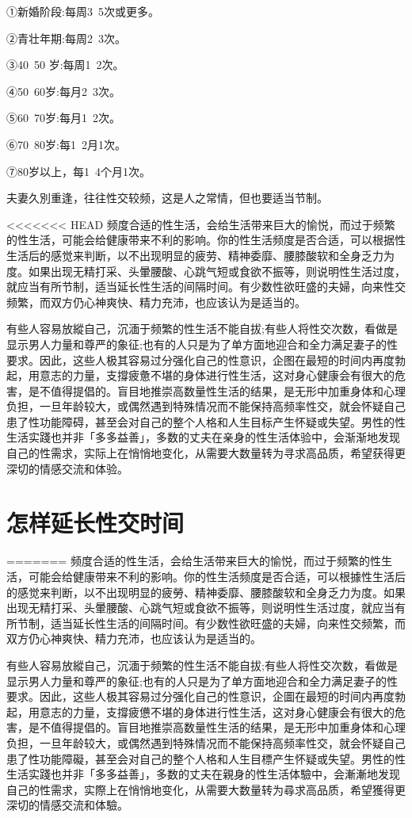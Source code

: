 \documentclass[12pt,UTF8]{ctexbook}
\begin{document}
①新婚阶段:每周3~5次或更多。

②青壮年期:每周2~3次。

③40~50 岁:每周1~2次。

④50~60岁:每月2~3次。

⑤60~70岁:每月1~2次。

⑥70~80岁:每1~2月1次。

⑦80岁以上，每1~4个月1次。

夫妻久別重逢，往往性交较频，这是人之常情，但也要适当节制。

<<<<<<< HEAD
频度合适的性生活，会给生活带来巨大的愉悦，而过于频繁的性生活，可能会给健康带来不利的影响。你的性生活频度是否合适，可以根据性生活后的感觉来判断，以不出现明显的疲劳、精神委靡、腰膝酸软和全身乏力为度。如果出现无精打采、头暈腰酸、心跳气短或食欲不振等，则说明性生活过度，就应当有所节制，适当延长性生活的间隔时间。有少数性欲旺盛的夫婦，向来性交频繁，而双方仍心神爽快、精力充沛，也应该认为是适当的。

有些人容易放縱自己，沉湎于频繁的性生活不能自拔;有些人将性交次数，看做是显示男人力量和尊严的象征;也有的人只是为了单方面地迎合和全力满足妻子的性要求。因此，这些人极其容易过分强化自己的性意识，企图在最短的时间内再度勃起，用意志的力量，支撐疲惫不堪的身体进行性生活，这对身心健康会有很大的危害，是不值得提倡的。盲目地推崇高数量性生活的结果，是无形中加重身体和心理负担，一旦年龄较大，或偶然遇到特殊情况而不能保持高频率性交，就会怀疑自己患了性功能障碍，甚至会对自己的整个人格和人生目标产生怀疑或失望。男性的性生活实踐也并非「多多益善」，多数的丈夫在亲身的性生活体验中，会渐渐地发现自己的性需求，实际上在悄悄地变化，从需要大数量转为寻求高品质，希望获得更深切的情感交流和体验。

\section{怎样延长性交时间}
=======
频度合适的性生活，会给生活带来巨大的愉悦，而过于频繁的性生活，可能会给健康带来不利的影响。你的性生活频度是否合适，可以根據性生活后的感觉来判断，以不出现明显的疲勞、精神委靡、腰膝酸软和全身乏力为度。如果出现无精打采、头暈腰酸、心跳气短或食欲不振等，则说明性生活过度，就应当有所节制，适当延长性生活的间隔时间。有少数性欲旺盛的夫婦，向来性交频繁，而双方仍心神爽快、精力充沛，也应该认为是适当的。

有些人容易放縱自己，沉湎于频繁的性生活不能自拔;有些人将性交次数，看做是显示男人力量和尊严的象征;也有的人只是为了单方面地迎合和全力满足妻子的性要求。因此，这些人极其容易过分强化自己的性意识，企圖在最短的时间内再度勃起，用意志的力量，支撐疲憊不堪的身体进行性生活，这对身心健康会有很大的危害，是不值得提倡的。盲目地推崇高数量性生活的结果，是无形中加重身体和心理负担，一旦年龄较大，或偶然遇到特殊情况而不能保持高频率性交，就会怀疑自己患了性功能障礙，甚至会对自己的整个人格和人生目標产生怀疑或失望。男性的性生活实踐也并非「多多益善」，多数的丈夫在親身的性生活体驗中，会漸漸地发现自己的性需求，实際上在悄悄地变化，从需要大数量转为尋求高品质，希望獲得更深切的情感交流和体驗。
\end{document}
